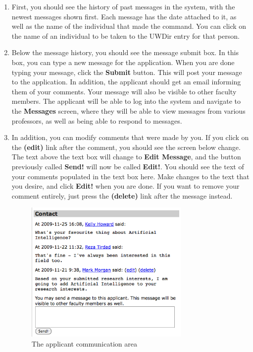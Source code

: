 \documentclass[titlepage]{article}
\begin{document}
\begin{enumerate}
\item First, you should see the history of past messages in the system, with the newest messages shown first. Each message has the date attached to it, as well as the name of the individual that made the command. You can click on the name of an individual to be taken to the UWDir entry for that person.

\item Below the message history, you should see the message submit box. In this box, you can type a new message for the application. When you are done typing your message, click the \textbf{\textsf{Submit}} button. This will post your message to the application. In addition, the applicant should get an email informing them of your comments. Your message will also be visible to other faculty members. The applicant will be able to log into the system and navigate to the \textbf{\textsf{Messages}} screen, where they will be able to view messages from various professors, as well as being able to respond to messages.

\item In addition, you can modify comments that were made by you. If you click
on the \textbf{\textsf{(edit)}} link after the comment, you should see the
screen below change. The text above the text box will change to
\textbf{\textsf{Edit Message}}, and the button previously called
\textbf{\textsf{Send!}} will now be called \textbf{\textsf{Edit!}}. You should
see the text of your comments populated in the text box here. Make changes to
the text that you desire, and click \textbf{\textsf{Edit!}} when you are done.
If you want to remove your comment entirely, just press the
\textbf{\textsf{(delete)}} link after the message instead.

\begin{figure}[h!]
  \begin{center}
  \includegraphics[width=8cm]{applicant_communication2.png}
  \end{center}
  \caption{The applicant communication area}
  \label{tCommunicate2}
\end{figure}

\end{enumerate}
\end{document}

